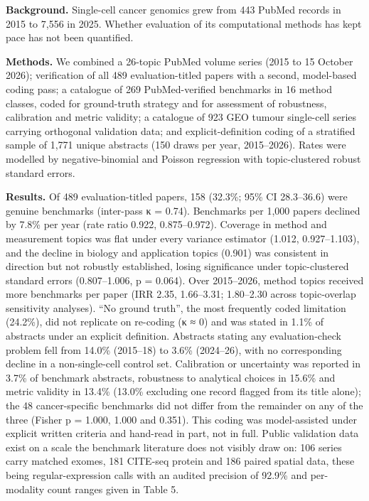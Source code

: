 \documentclass[11pt]{article}
\begin{document}
\textbf{Background.} Single-cell cancer genomics grew from 443 PubMed
records in 2015 to 7,556 in 2025. Whether evaluation of its
computational methods has kept pace has not been quantified.

\textbf{Methods.} We combined a 26-topic PubMed volume series (2015 to
15 October 2026); verification of all 489 evaluation-titled papers with
a second, model-based coding pass; a catalogue of 269 PubMed-verified
benchmarks in 16 method classes, coded for ground-truth strategy and for
assessment of robustness, calibration and metric validity; a catalogue
of 923 GEO tumour single-cell series carrying orthogonal validation
data; and explicit-definition coding of a stratified sample of 1,771
unique abstracts (150 draws per year, 2015--2026). Rates were modelled
by negative-binomial and Poisson regression with topic-clustered robust
standard errors.

\textbf{Results.} Of 489 evaluation-titled papers, 158 (32.3\%; 95\% CI
28.3--36.6) were genuine benchmarks (inter-pass κ = 0.74). Benchmarks
per 1,000 papers declined by 7.8\% per year (rate ratio 0.922,
0.875--0.972). Coverage in method and measurement topics was flat under
every variance estimator (1.012, 0.927--1.103), and the decline in
biology and application topics (0.901) was consistent in direction but
not robustly established, losing significance under topic-clustered
standard errors (0.807--1.006, p = 0.064). Over 2015--2026, method
topics received more benchmarks per paper (IRR 2.35, 1.66--3.31;
1.80--2.30 across topic-overlap sensitivity analyses). ``No ground
truth'', the most frequently coded limitation (24.2\%), did not
replicate on re-coding (κ ≈ 0) and was stated in 1.1\% of abstracts
under an explicit definition. Abstracts stating any evaluation-check
problem fell from 14.0\% (2015--18) to 3.6\% (2024--26), with no
corresponding decline in a non-single-cell control set. Calibration or
uncertainty was reported in 3.7\% of benchmark abstracts, robustness to
analytical choices in 15.6\% and metric validity in 13.4\% (13.0\%
excluding one record flagged from its title alone); the 48
cancer-specific benchmarks did not differ from the remainder on any of
the three (Fisher p = 1.000, 1.000 and 0.351). This coding was
model-assisted under explicit written criteria and hand-read in part,
not in full. Public validation data exist on a scale the benchmark
literature does not visibly draw on: 106 series carry matched exomes,
181 CITE-seq protein and 186 paired spatial data, these being
regular-expression calls with an audited precision of 92.9\% and
per-modality count ranges given in Table 5.
\end{document}
